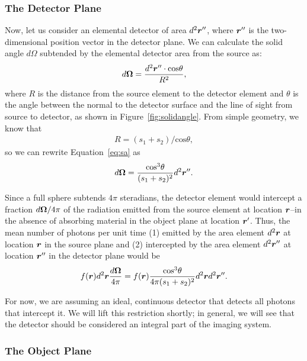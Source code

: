 \documentclass[mphy386-notes.tex]{subfiles}
\begin{document}

\subsubsection{The Detector Plane}

Now, let us consider an elemental detector of area $d^2\boldsymbol{r}''$, where
$\boldsymbol{r}''$ is the two-dimensional position vector in the detector plane.
We can calculate the solid angle $d\Omega$ subtended by the elemental
detector area from the source as:
\begin{align}
  d\boldsymbol{\Omega} = \frac{d^2\boldsymbol{r}''\cdot\text{cos}\theta}{R^2},
  \label{eq:sa}
\end{align}
where $R$ is the distance from the source element to the detector element and
$\theta$ is the angle between the normal to the detector surface and the line of
sight from source to detector, as shown in Figure~\ref{fig:solidangle}. From
simple geometry, we know that
\begin{align}
  R = (s_1 + s_2) / \text{cos}\theta,
\end{align}
so we can rewrite Equation~\ref{eq:sa} as
\begin{align}
  d\boldsymbol{\Omega} = \frac{\text{cos}^3\theta}{(s_1 + s_2)^2}d^2\boldsymbol{r}''.
\end{align}

Since a full sphere subtends $4\pi$ steradians, the detector element would
intercept a fraction $d\boldsymbol{\Omega}/4\pi$ of the radiation emitted from
the source element at location $\boldsymbol{r}$--in the absence of absorbing material in the
object plane at location $\boldsymbol{r}'$. Thus, the mean number of
photons per unit time (1) emitted by the area element $d^2\boldsymbol{r}$ at location $\boldsymbol{r}$ in the source
plane and (2) intercepted by the area element $d^2\boldsymbol{r}''$ at location $\boldsymbol{r}''$ in the detector
plane would be
\begin{align}
  f(\boldsymbol{r})d^2\boldsymbol{r}\frac{d\boldsymbol{\Omega}}{4\pi} = f(\boldsymbol{r})\frac{\text{cos}^3\theta}{4\pi(s_1+s_2)^2}d^2\boldsymbol{r}d^2\boldsymbol{r}''.
\end{align}

For now, we are assuming an ideal, continuous detector that detects all photons
that intercept it. We will lift this restriction shortly; in general, we will
see that the detector should be considered an integral part of the imaging
system.

\subsubsection{The Object Plane}
\end{document}
